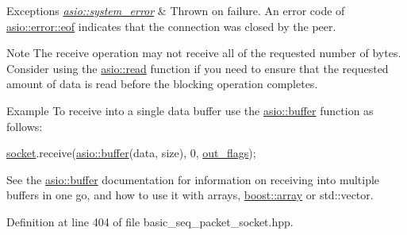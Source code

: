 \begin{DoxyExceptions}{Exceptions}
{\em \hyperlink{classasio_1_1system__error}{asio\+::system\+\_\+error}} & Thrown on failure. An error code of \hyperlink{namespaceasio_1_1error_ade61a402d1dfb10b1c223906f5ea7847abb0b3b47deff67dd67b180d9d1e34154}{asio\+::error\+::eof} indicates that the connection was closed by the peer.\\
\hline
\end{DoxyExceptions}
\begin{DoxyNote}{Note}
The receive operation may not receive all of the requested number of bytes. Consider using the \hyperlink{group__read}{asio\+::read} function if you need to ensure that the requested amount of data is read before the blocking operation completes.
\end{DoxyNote}
\begin{DoxyParagraph}{Example}
To receive into a single data buffer use the \hyperlink{group__buffer}{asio\+::buffer} function as follows\+: 
\begin{DoxyCode}
\hyperlink{namespacewebsocketpp_1_1transport_1_1asio_1_1socket_1_1error_a828ddaa5ed63a761e1b557465a35f05aa0c31b356014843e1d09514e794a539a7}{socket}.receive(\hyperlink{group__buffer_ga1ed66e401559cbfd19595392f653b47c}{asio::buffer}(data, size), 0, \hyperlink{classasio_1_1basic__seq__packet__socket_a8e5185dc6014d8e5f9e91ab7743ace7c}{out\_flags});
\end{DoxyCode}
 See the \hyperlink{group__buffer}{asio\+::buffer} documentation for information on receiving into multiple buffers in one go, and how to use it with arrays, \hyperlink{classboost_1_1array}{boost\+::array} or std\+::vector. 
\end{DoxyParagraph}


Definition at line 404 of file basic\+\_\+seq\+\_\+packet\+\_\+socket.\+hpp.

\hypertarget{classasio_1_1basic__seq__packet__socket_a3489347e101ca045c9edc61859065c54}{}

